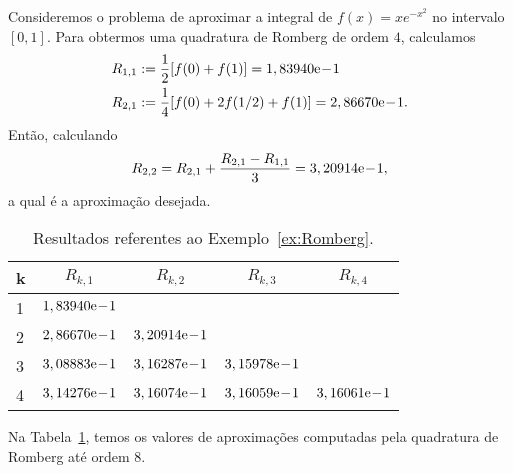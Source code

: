 \begin{ex}\label{ex:Romberg}
  Consideremos o problema de aproximar a integral de $f(x)=xe^{-x^2}$ no intervalo $[0, 1]$. Para obtermos uma quadratura de Romberg de ordem $4$, calculamos
  \begin{align}
    R_{1,1} &:= \frac{1}{2}[f(0) + f(1)] = 1,83940\mathrm{e}\!-\!1\\
    R_{2,1} &:= \frac{1}{4}[f(0) + 2f(1/2) + f(1)] = 2,86670\mathrm{e}\!-\!1.
  \end{align}
Então, calculando
\begin{equation}
  R_{2,2} = R_{2,1} + \frac{R_{2,1}-R_{1,1}}{3} = 3,20914\mathrm{e}\!-\!1,
\end{equation}
a qual é a aproximação desejada.

\begin{table}[h!]
  \centering
  \caption{Resultados referentes ao Exemplo~\ref{ex:Romberg}.}
  \begin{tabular}{l|cccc}
    k & $R_{k,1}$ & $R_{k,2}$ & $R_{k,3}$ & $R_{k,4}$ \\\hline
    1 & $1,83940\mathrm{e}\!-\!1$ \\
    2 & $2,86670\mathrm{e}\!-\!1$ & $3,20914\mathrm{e}\!-\!1$ \\
    3 & $3,08883\mathrm{e}\!-\!1$ & $3,16287\mathrm{e}\!-\!1$ & $3,15978\mathrm{e}\!-\!1$ \\
    4 & $3,14276\mathrm{e}\!-\!1$ & $3,16074\mathrm{e}\!-\!1$ & $3,16059\mathrm{e}\!-\!1$ &  $3,16061\mathrm{e}\!-\!1$\\\hline
  \end{tabular}
  \label{tab:ex_Romberg}
\end{table}

Na Tabela~\ref{tab:ex_Romberg}, temos os valores de aproximações computadas pela quadratura de Romberg até ordem $8$.



\end{ex}

